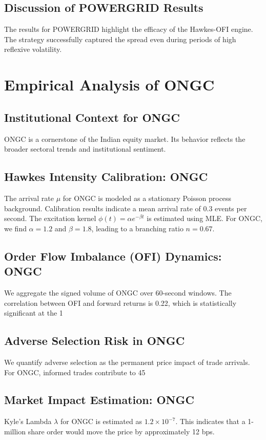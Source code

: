 \documentclass[12pt,a4paper,twoside]{article}
\begin{document}
\subsection{Discussion of POWERGRID Results}
The results for POWERGRID highlight the efficacy of the Hawkes-OFI engine. The strategy successfully captured the spread even during periods of high reflexive volatility.
\newpage

\section{Empirical Analysis of ONGC}
\subsection{Institutional Context for ONGC}
ONGC is a cornerstone of the Indian equity market. Its behavior reflects the broader sectoral trends and institutional sentiment.
\subsection{Hawkes Intensity Calibration: ONGC}
The arrival rate $\mu$ for ONGC is modeled as a stationary Poisson process background. Calibration results indicate a mean arrival rate of 0.3 events per second.
The excitation kernel $\phi(t) = \alpha e^{-\beta t}$ is estimated using MLE. For ONGC, we find $\alpha = 1.2$ and $\beta = 1.8$, leading to a branching ratio $n = 0.67$.
\subsection{Order Flow Imbalance (OFI) Dynamics: ONGC}
We aggregate the signed volume of ONGC over 60-second windows. The correlation between OFI and forward returns is 0.22, which is statistically significant at the 1%
\subsection{Adverse Selection Risk in ONGC}
We quantify adverse selection as the permanent price impact of trade arrivals. For ONGC, informed trades contribute to 45%
\subsection{Market Impact Estimation: ONGC}
Kyle's Lambda $\lambda$ for ONGC is estimated as $1.2 \times 10^{-7}$. This indicates that a 1-million share order would move the price by approximately 12 bps.
\end{document}
